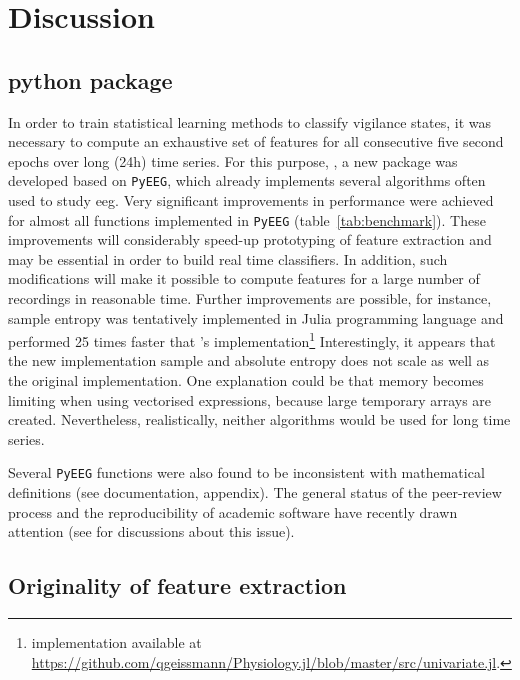 \section{Discussion} \label{discussion}

\subsection{python package}
 
In order to train statistical learning methods to classify vigilance states,
it was necessary to compute an exhaustive set of features for all consecutive five second epochs
over long (24h) time series.
For this purpose, \pr{}, a new \py{} package was developed based on
\texttt{PyEEG}\citationneeded{},  which already implements several algorithms often used to study \gls{eeg}.
Very significant improvements in performance were achieved for almost all functions implemented in \texttt{PyEEG}
(table~\ref{tab:benchmark}). These improvements will considerably speed-up prototyping of feature extraction
and may be essential in order to build real time classifiers.
In addition, such modifications will make it possible to compute features for a large number
of recordings in reasonable time.
Further improvements are possible, for instance,
sample entropy was tentatively implemented in Julia programming language and performed 25 times faster that
\pr{}'s implementation\footnote{implementation available at
\href{https://github.com/qgeissmann/Physiology.jl/blob/master/src/univariate.jl}{https://github.com/qgeissmann/Physiology.jl/blob/master/src/univariate.jl}.}
Interestingly, it appears that the new implementation sample and
absolute entropy does not scale as well as the original implementation.
One explanation could be that memory becomes limiting when using vectorised expressions, because large temporary arrays are created.
Nevertheless, realistically, neither algorithms would be used for long time series.

Several \texttt{PyEEG} functions were also found to be inconsistent with mathematical
definitions (see \pr{} documentation, appendix).
The general status of the peer-review process and the reproducibility of academic software have recently drawn attention (see  for discussions about this issue).

\subsection{Originality of feature extraction}

